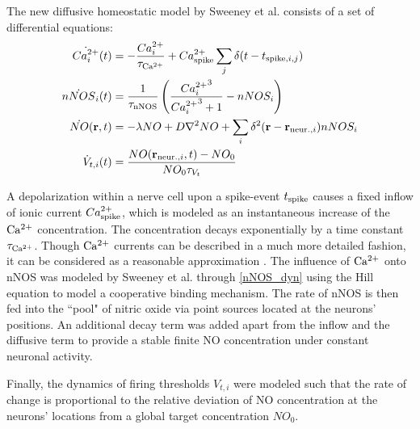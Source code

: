 \documentclass[10pt,letterpaper]{article}
\begin{document}
The new diffusive homeostatic model by Sweeney et al. consists of a set of differential equations:   
\begin{align}
\dot{{Ca_i^{2+}}}(t) &= -\frac{{Ca_i^{2+}}}{\tau_{\rm Ca^{2+}}} + Ca^{2+}_{\rm spike} \sum_{j} \delta(t-t_{\mathrm{spike},i,j}) \label{Ca_dyn}\\
\dot{nNOS}_i(t) &= \frac{1}{\tau_{\rm nNOS}} \left(\frac{{Ca_i^{2+}}^3}{{Ca_i^{2+}}^3+1} - nNOS_i \right) \label{nNOS_dyn}\\
\dot{NO}(\mathbf{r},t)&=-\lambda NO + D \nabla^2 NO + \sum_{i} \delta^2(\mathbf{r}-\mathbf{r}_{\mathrm{neur.},i}) nNOS_i \label{NO_dyn}\\
\dot{V}_{t,i}(t) &= \frac{NO(\mathbf{r}_{\mathrm{neur.},i},t)-NO_0}{NO_0 \tau_{V_t}} \label{Theta_dyn}
\end{align}

A depolarization within a nerve cell upon a spike-event $t_{\rm spike}$ causes a fixed inflow of ionic current $Ca^{2+}_{\rm spike}$, which is modeled as an instantaneous increase of the $\rm Ca^{2+}$ concentration. The concentration decays exponentially by a time constant $\tau_{\rm Ca^{2+}}$. Though $\rm Ca^{2+}$ currents can be described in a much more detailed fashion, it can be considered as a reasonable approximation \cite[p.~198-203]{Theor_Neur_Dayan}. The influence of $\rm Ca^{2+}$ onto nNOS was modeled by Sweeney et al. through \eqref{nNOS_dyn} using the Hill equation \cite{Hill_Equ} to model a cooperative binding mechanism. The rate of nNOS is then fed into the ``pool" of nitric oxide via point sources located at the neurons' positions. An additional decay term was added apart from the inflow and the diffusive term to provide a stable finite NO concentration under constant neuronal activity.

Finally, the dynamics of firing thresholds $V_{t,i}$ were modeled such that the rate of change is proportional to the relative deviation of NO concentration at the neurons' locations from a global target concentration $NO_0$. 
\end{document}
